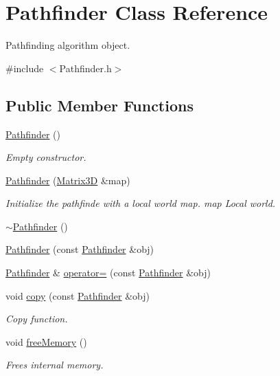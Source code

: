 \hypertarget{classPathfinder}{\section{Pathfinder Class Reference}
\label{classPathfinder}
}


Pathfinding algorithm object.  




{\ttfamily \#include $<$Pathfinder.\-h$>$}

\subsection*{Public Member Functions}
\begin{DoxyCompactItemize}
\item 
\hyperlink{classPathfinder_af562d840858cf2b369fcee51f5069456}{Pathfinder} ()
\begin{DoxyCompactList}\small\item\em Empty constructor. \end{DoxyCompactList}\item 
\hyperlink{classPathfinder_a52ace2447eb20a8736c9b6eecb2a39e4}{Pathfinder} (\hyperlink{classMatrix3D}{Matrix3\-D} \&map)
\begin{DoxyCompactList}\small\item\em Initialize the pathfinde with a local world map.  map Local world. \end{DoxyCompactList}\item 
\hyperlink{classPathfinder_a5b39561ad7375cfdc493d58cbb9fdc1b}{$\sim$\-Pathfinder} ()
\item 
\hyperlink{classPathfinder_ace22f0efc61b22a923f0c01fdcea0fb1}{Pathfinder} (const \hyperlink{classPathfinder}{Pathfinder} \&obj)
\item 
\hyperlink{classPathfinder}{Pathfinder} \& \hyperlink{classPathfinder_a7d1e82ebc1cf7c5f36a418f61721c61c}{operator=} (const \hyperlink{classPathfinder}{Pathfinder} \&obj)
\item 
void \hyperlink{classPathfinder_a2760969261a397539e0be0ec0ad25267}{copy} (const \hyperlink{classPathfinder}{Pathfinder} \&obj)
\begin{DoxyCompactList}\small\item\em Copy function. \end{DoxyCompactList}\item 
void \hyperlink{classPathfinder_aa92e55229fec296527e2975889fed2bd}{free\-Memory} ()
\begin{DoxyCompactList}\small\item\em Frees internal memory. \end{DoxyCompactList}\item 

\end{DoxyCompactItemize}
